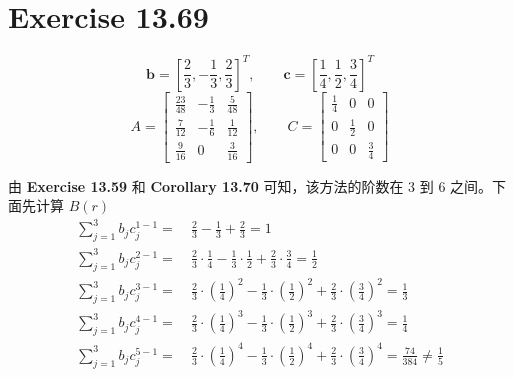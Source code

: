 \documentclass[a4paper]{article}
\begin{document}
\section*{Exercise 13.69}

\begin{equation}
    \mathbf{b} = \left[
        \frac{2}{3}, -\frac{1}{3}, \frac{2}{3}
    \right]^T, \qquad
    \mathbf{c} = \left[
        \frac{1}{4}, \frac{1}{2}, \frac{3}{4}
    \right]^T
\end{equation}
\begin{equation}
    A = \begin{bmatrix}
        \frac{23}{48} & -\frac{1}{3} & \frac{5}{48}\\
        \frac{7}{12} & -\frac{1}{6} & \frac{1}{12}\\
        \frac{9}{16} & 0 & \frac{3}{16}
    \end{bmatrix}, \qquad
    C = \begin{bmatrix}
        \frac{1}{4} & 0 & 0\\
        0 & \frac{1}{2} & 0\\
        0 & 0 & \frac{3}{4}
    \end{bmatrix}
\end{equation}
\par 由 \textbf{Exercise 13.59} 和 \textbf{Corollary 13.70} 
可知，该方法的阶数在 3 到 6 之间。下面先计算 $B(r)$
\begin{equation}
    \begin{aligned}
        \sum_{j=1}^{3} b_j c_j^{1-1}
        =&\ \frac{2}{3}-\frac{1}{3}+\frac{2}{3} = 1\\
        \sum_{j=1}^{3} b_j c_j^{2-1}
        =&\ \frac{2}{3}\cdot\frac{1}{4}-\frac{1}{3}\cdot\frac{1}{2}+\frac{2}{3}\cdot\frac{3}{4} = \frac{1}{2}\\
        \sum_{j=1}^{3} b_j c_j^{3-1}
        =&\ \frac{2}{3}\cdot\left(\frac{1}{4}\right)^2-\frac{1}{3}\cdot\left(\frac{1}{2}\right)^2+\frac{2}{3}\cdot\left(\frac{3}{4}\right)^2 = \frac{1}{3}\\
        \sum_{j=1}^{3} b_j c_j^{4-1}
        =&\ \frac{2}{3}\cdot\left(\frac{1}{4}\right)^3-\frac{1}{3}\cdot\left(\frac{1}{2}\right)^3+\frac{2}{3}\cdot\left(\frac{3}{4}\right)^3 = \frac{1}{4}\\
        \sum_{j=1}^{3} b_j c_j^{5-1}
        =&\ \frac{2}{3}\cdot\left(\frac{1}{4}\right)^4-\frac{1}{3}\cdot\left(\frac{1}{2}\right)^4+\frac{2}{3}\cdot\left(\frac{3}{4}\right)^4 =\frac{74}{384}\neq \frac{1}{5}\\
    \end{aligned}
\end{equation}
\end{document}
